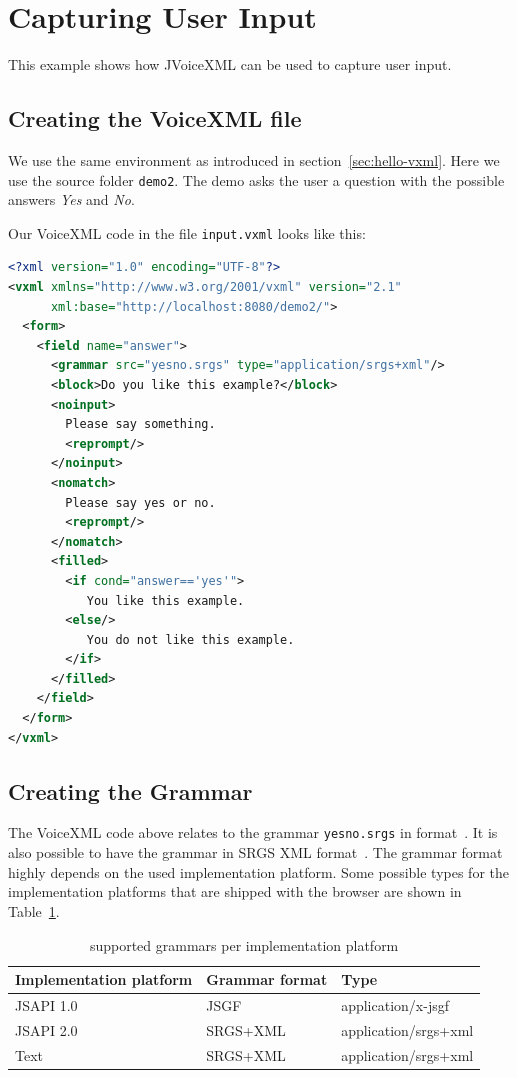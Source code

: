 \documentclass[11pt,a4paper]{book}
\begin{document}
\section{Capturing User Input}

This example shows how JVoiceXML can be used to capture user input. 

\subsection{Creating the VoiceXML file}

We use the same environment as introduced in section~\ref{sec:hello-vxml}. Here
we use the source folder \texttt{demo2}.
The demo asks the user a question with the possible answers
\emph{Yes} and \emph{No}.

Our VoiceXML code in the file \texttt{input.vxml} looks like this:

\begin{lstlisting}[language=XML]
<?xml version="1.0" encoding="UTF-8"?> 
<vxml xmlns="http://www.w3.org/2001/vxml" version="2.1"
      xml:base="http://localhost:8080/demo2/">
  <form>
    <field name="answer">
      <grammar src="yesno.srgs" type="application/srgs+xml"/>
      <block>Do you like this example?</block>
      <noinput>
        Please say something.
        <reprompt/>
      </noinput>
      <nomatch>
        Please say yes or no.
        <reprompt/>
      </nomatch>
      <filled>
        <if cond="answer=='yes'">
           You like this example.
        <else/>
           You do not like this example.
        </if>
      </filled>
    </field>
  </form>
</vxml>
\end{lstlisting}

\subsection{Creating the Grammar}
\label{sec:creating-grammar}

The VoiceXML code above relates to the grammar \texttt{yesno.srgs} in 
format~\cite{w3c:srgs}.
It is also possible to have the grammar in SRGS XML format~\cite{w3c:2000:jsgf}.
The grammar format highly depends on the used implementation platform. Some
possible types for the implementation platforms that are shipped with the
browser are shown in Table~\ref{tbl:grammar-types}.

\begin{table}
\begin{center}
\begin{tabular}{|l|l|l|}
\hline
\textbf{Implementation platform} & \textbf{Grammar format} & \textbf{Type} \\
\hline
\hline
JSAPI 1.0 & JSGF & application/x-jsgf \\
\hline
JSAPI 2.0 & SRGS+XML & application/srgs+xml \\
\hline
Text & SRGS+XML & application/srgs+xml \\
\hline
\end{tabular}
\end{center}
\caption{supported grammars per implementation platform}
\label{tbl:grammar-types}
\end{table}
\end{document}
